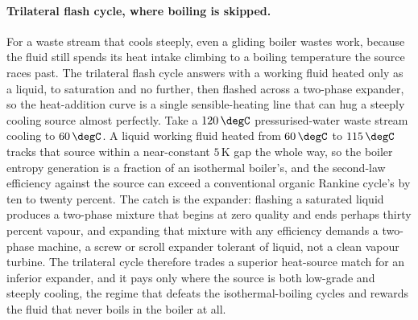 \paragraph{Trilateral flash cycle, where boiling is skipped.} For a waste stream
that cools steeply, even a gliding boiler wastes work, because the fluid still
spends its heat intake climbing to a boiling temperature the source races past.
The trilateral flash cycle answers with a working fluid heated only as a liquid,
to saturation and no further, then flashed across a two-phase expander, so the
heat-addition curve is a single sensible-heating line that can hug a steeply
cooling source almost perfectly. Take a $120\,\degC$ pressurised-water waste
stream cooling to $60\,\degC$. A liquid working fluid heated from $60\,\degC$ to
$115\,\degC$ tracks that source within a near-constant $5\,\si{\kelvin}$ gap the
whole way, so the boiler entropy generation is a fraction of an isothermal
boiler's, and the second-law efficiency against the source can exceed a
conventional organic Rankine cycle's by ten to twenty percent. The catch is the
expander: flashing a saturated liquid produces a two-phase mixture that begins at
zero quality and ends perhaps thirty percent vapour, and expanding that mixture
with any efficiency demands a two-phase machine, a screw or scroll expander
tolerant of liquid, not a clean vapour turbine. The trilateral cycle therefore
trades a superior heat-source match for an inferior expander, and it pays only
where the source is both low-grade and steeply cooling, the regime that defeats
the isothermal-boiling cycles and rewards the fluid that never boils in the
boiler at all.

